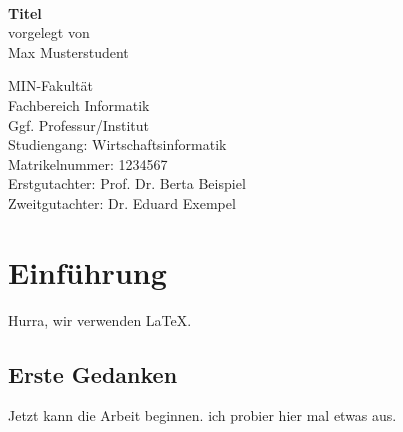 \documentclass[11pt,a4paper]{scrbook}
\begin{document}
\frontmatter
{}
\begin{titlepage}

\vspace*{2cm}
\Large
\begin{center} 
      {\color{uhhred}\textbf{}}
\vspace*{2.0cm}\\
{\LARGE \textbf{Titel}}
\vspace*{2.0cm}\\
vorgelegt von
\vspace*{0.4cm}\\
Max Musterstudent
\end{center}
\vspace*{3.9cm}

\noindent 
MIN-Fakultät \vspace*{0.4cm} \\ 
Fachbereich Informatik \vspace*{0.4cm} \\ 
Ggf. Professur/Institut \vspace*{0.4cm} \\
Studiengang: Wirtschaftsinformatik \vspace*{0.4cm} \\ 
Matrikelnummer: 1234567 \vspace*{0.8cm} \\ 
Erstgutachter: Prof. Dr. Berta Beispiel \vspace*{0.4cm} \\ 
Zweitgutachter: Dr. Eduard Exempel

\end{titlepage}

\restoregeometry

\tableofcontents

\mainmatter 

\chapter{Einführung}

Hurra, wir verwenden \LaTeX.

\section{Erste Gedanken}

Jetzt kann die Arbeit beginnen. ich probier hier mal etwas aus.
\end{document}
